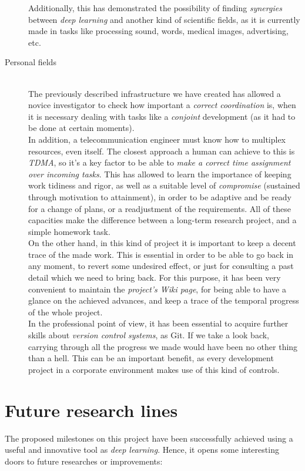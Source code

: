 \begin{description}
			Additionally, this has demonstrated the possibility of finding \emph{synergies} between \emph{deep learning} and another kind of scientific fields, as it is currently made in tasks like processing sound, words, medical images, advertising, etc.
		
		\item[Personal fields] \hfill
			\vspace{0.2in} \\
			The previously described infrastructure we have created has allowed a novice investigator to check how important a \emph{correct coordination} is, when it is necessary dealing with tasks like a \emph{conjoint} development (as it had to be done at certain moments).\\
			
			In addition, a telecommunication engineer must know how to multiplex resources, even itself. The closest approach a human can achieve to this is \emph{TDMA}, so it's a key factor to be able to \emph{make a correct time assignment over incoming tasks}. This has allowed to learn the importance of keeping work tidiness and rigor, as well as a suitable level of \emph{compromise} (sustained through motivation to attainment), in order to be adaptive and be ready for a change of plans, or a readjustment of the requirements. All of these capacities make the difference between a long-term research project, and a simple homework task.\\
			
			On the other hand, in this kind of project it is important to keep a decent trace of the made work. This is essential in order to be able to go back in any moment, to revert some undesired effect, or just for consulting a past detail which we need to bring back. For this purpose, it has been very convenient to maintain the \emph{project's Wiki page}, for being able to have a glance on the achieved advances, and keep a trace of the temporal progress of the whole project.\\
			
			
			In the professional point of view, it has been essential to acquire further skills about \emph{version control systems}, as Git. If we take a look back, carrying through all the progress we made would have been no other thing than a hell. This can be an important benefit, as every development project in a corporate environment makes use of this kind of controls.
		
	\end{description}
\section{Future research lines}
	The proposed milestones on this project have been successfully achieved using a useful and innovative tool as \emph{deep learning}. Hence, it opens some interesting doors to future researches or improvements:
	
